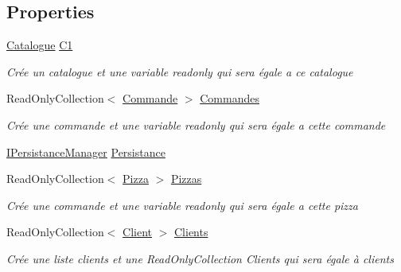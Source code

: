 \subsection*{Properties}
\begin{DoxyCompactItemize}
\item 
\hyperlink{classModele_1_1Catalogue}{Catalogue} \hyperlink{classModele_1_1Manager_a54bbc7bd646fcaa0f1a590310dd3c02c}{C1}
\begin{DoxyCompactList}\small\item\em Crée un catalogue et une variable readonly qui sera égale a ce catalogue \end{DoxyCompactList}\item 
Read\+Only\+Collection$<$ \hyperlink{classModele_1_1Commande}{Commande} $>$ \hyperlink{classModele_1_1Manager_a0c0ba218c22011e46bdeddff3f6ca5d0}{Commandes}
\begin{DoxyCompactList}\small\item\em Crée une commande et une variable readonly qui sera égale a cette commande \end{DoxyCompactList}\item 
\hyperlink{interfaceModele_1_1IPersistanceManager}{I\+Persistance\+Manager} \hyperlink{classModele_1_1Manager_a29b4f8c42f993178aac1d16da7942324}{Persistance}
\item 
Read\+Only\+Collection$<$ \hyperlink{classModele_1_1Pizza}{Pizza} $>$ \hyperlink{classModele_1_1Manager_a01701f7ed04aac12fd6a623c2e382d0c}{Pizzas}
\begin{DoxyCompactList}\small\item\em Crée une commande et une variable readonly qui sera égale a cette pizza \end{DoxyCompactList}\item 
Read\+Only\+Collection$<$ \hyperlink{classModele_1_1Client}{Client} $>$ \hyperlink{classModele_1_1Manager_aa91d850a379289e56012fc9b3912a7fe}{Clients}
\begin{DoxyCompactList}\small\item\em Crée une liste clients et une Read\+Only\+Collection Clients qui sera égale à clients \end{DoxyCompactList}\item 

\end{DoxyCompactItemize}
